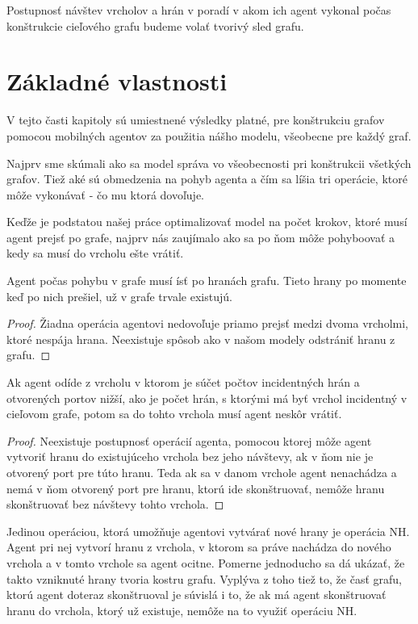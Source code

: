 \begin{ozn}
Postupnosť návštev vrcholov a hrán v poradí v akom ich agent vykonal počas
konštrukcie cieľového grafu budeme volať tvorivý sled grafu.
\end{ozn}

\section{Základné vlastnosti}
V tejto časti kapitoly sú umiestnené výsledky platné, pre konštrukciu grafov
pomocou mobilných agentov za použitia nášho modelu, všeobecne pre každý
graf.

Najprv sme skúmali ako sa model správa vo všeobecnosti pri konštrukcii
všetkých grafov. Tiež aké sú obmedzenia na pohyb agenta a čím sa líšia tri
operácie, ktoré môže vykonávať - čo mu ktorá dovoľuje.

Keďže je podstatou našej práce optimalizovať model na počet krokov, ktoré
musí agent prejsť po grafe, najprv nás zaujímalo ako sa po ňom môže
pohyboovať a kedy sa musí do vrcholu ešte vrátiť.

\begin{lem}
Agent počas pohybu v grafe musí ísť po hranách grafu. 
Tieto hrany po momente keď po nich prešiel, už v grafe trvale existujú.
\end{lem}

\begin{proof}
Žiadna operácia agentovi nedovoľuje priamo prejsť medzi dvoma vrcholmi, ktoré
nespája hrana. Neexistuje spôsob ako v našom modely odstrániť hranu z grafu.
\end{proof}

\begin{lem}
Ak agent odíde z vrcholu v ktorom je súčet počtov incidentných hrán a
otvorených portov nižší, ako je počet hrán, s ktorými má byť vrchol
incidentný v cieľovom grafe, potom sa do tohto vrchola musí agent
neskôr vrátiť.
\end{lem}

\begin{proof}
Neexistuje postupnosť operácií agenta, pomocou ktorej môže agent vytvoriť
hranu do
existujúceho vrchola bez jeho návštevy, ak v ňom nie je otvorený port pre
túto hranu. 
Teda ak sa
v danom vrchole agent nenachádza a nemá v ňom otvorený port pre hranu,
ktorú ide skonštruovať, nemôže hranu skonštruovať bez návštevy tohto vrchola.
\end{proof}

Jedinou operáciou, ktorá umožňuje agentovi vytvárať nové hrany je operácia
NH. Agent pri nej vytvorí hranu z vrchola, v ktorom sa práve nachádza do
nového vrchola a v tomto vrchole sa agent ocitne. Pomerne jednoducho sa dá
ukázať, že takto vzniknuté hrany tvoria kostru grafu. Vyplýva z toho tiež
to, že časť grafu, ktorú agent doteraz skonštruoval je súvislá i to, že ak
má agent skonštruovať hranu do vrchola, ktorý už existuje, nemôže na to
využiť operáciu NH.

